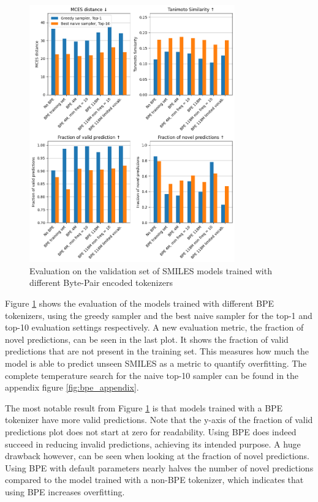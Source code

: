 \begin{figure}[h]
    \centering
    \includegraphics[width=0.79\textwidth]{figures/results/bpe_with_tanimoto.png}
    \caption{Evaluation on the validation set of SMILES models trained with different Byte-Pair encoded tokenizers}
    \label{fig:bpe}
\end{figure}

Figure \ref{fig:bpe} shows the evaluation of the models trained with different \ac{BPE} tokenizers, using the greedy sampler and the best naive sampler for the top-1 and top-10 evaluation settings respectively.
A new evaluation metric, the fraction of novel predictions, can be seen in the last plot.
It shows the fraction of valid predictions that are not present in the training set.
This measures how much the model is able to predict unseen SMILES as a metric to quantify overfitting.
The complete temperature search for the naive top-10 sampler can be found in the appendix figure \ref{fig:bpe_appendix}.

The most notable result from Figure \ref{fig:bpe} is that models trained with a \ac{BPE} tokenizer have more valid predictions.
Note that the y-axis of the fraction of valid predictions plot does not start at zero for readability.
Using \ac{BPE} does indeed succeed in reducing invalid predictions, achieving its intended purpose.
A huge drawback however, can be seen when looking at the fraction of novel predictions.
Using \ac{BPE} with default parameters nearly halves the number of novel predictions compared to the model trained with a non-BPE tokenizer, which indicates that using \ac{BPE} increases overfitting.

